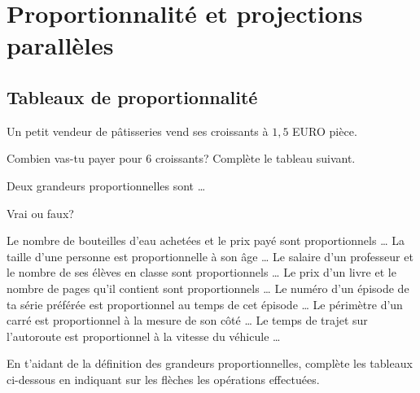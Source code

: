 \documentclass[../math2.tex]{subfiles}
\begin{document}
%
%

\chapter{Proportionnalité et projections parallèles} 

\section{Tableaux de proportionnalité}

Un petit vendeur de pâtisseries vend ses croissants à $1,5$ EURO pièce.

\begin{tasks}
  \task Combien vas-tu payer pour 6 croissants?
  \task Complète le tableau suivant.
\end{tasks} 
  \begin{table}[]
  \end{table}

Deux grandeurs proportionnelles sont \dots

\begin{exercise}
  Vrai ou faux? 
  \begin{tasks}
    \task Le nombre de bouteilles d'eau achetées et le prix payé sont proportionnels \dots
    \task La taille d'une personne est proportionnelle à son âge \dots
    \task Le salaire d'un professeur et le nombre de ses élèves en classe sont proportionnels \dots
    \task Le prix d'un livre et le nombre de pages qu'il contient sont proportionnels \dots
    \task Le numéro d'un épisode de ta série préférée est proportionnel au temps de cet épisode \dots
    \task Le périmètre d'un carré est proportionnel à la mesure de son côté \dots
    \task Le temps de trajet sur l'autoroute est proportionnel à la vitesse du véhicule \dots
  \end{tasks}
\end{exercise}

\begin{exercise}
En t'aidant de la définition des grandeurs proportionnelles, complète les tableaux ci-dessous en indiquant sur les flèches les opérations effectuées.
\end{exercise}
\end{document}

